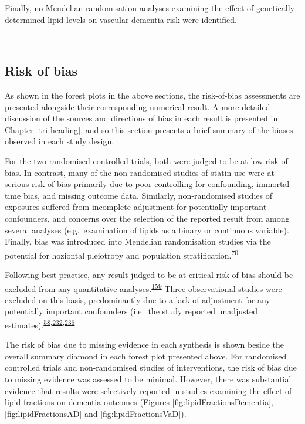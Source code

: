 \documentclass[a4paper, twoside]{templates/ociamthesis}
\begin{document}
Finally, no Mendelian randomisation analyses examining the effect of genetically determined lipid levels on vascular dementia risk were identified.

~

\hypertarget{risk-of-bias-res}{%
\subsection{Risk of bias}\label{risk-of-bias-res}}

As shown in the forest plots in the above sections, the risk-of-bias assessments are presented alongside their corresponding numerical result. A more detailed discussion of the sources and directions of bias in each result is presented in Chapter \ref{tri-heading}, and so this section presents a brief summary of the biases observed in each study design.

For the two randomised controlled trials, both were judged to be at low risk of bias. In contrast, many of the non-randomised studies of statin use were at serious risk of bias primarily due to poor controlling for confounding, immortal time bias, and missing outcome data. Similarly, non-randomised studies of exposures suffered from incomplete adjustment for potentially important confounders, and concerns over the selection of the reported result from among several analyses (e.g.~examination of lipids as a binary or continuous variable). Finally, bias was introduced into Mendelian randomisation studies via the potential for hoziontal pleiotropy and population stratification.\textsuperscript{\protect\hyperlink{ref-davies2018}{70}}

Following best practice, any result judged to be at critical risk of bias should be excluded from any quantitative analyses.\textsuperscript{\protect\hyperlink{ref-sterne2016}{159}} Three observational studies were excluded on this basis, predominantly due to a lack of adjustment for any potentially important confounders (i.e.~the study reported unadjusted estimates).\textsuperscript{\protect\hyperlink{ref-mainous2005}{58},\protect\hyperlink{ref-kuo2015}{232},\protect\hyperlink{ref-notkola1998}{236}}

The risk of bias due to missing evidence in each synthesis is shown beside the overall summary diamond in each forest plot presented above. For randomised controlled trials and non-randomised studies of interventions, the risk of bias due to missing evidence was assessed to be minimal. However, there was substantial evidence that results were selectively reported in studies examining the effect of lipid fractions on dementia outcomes (Figures \ref{fig:lipidFractionsDementia}, \ref{fig:lipidFractionsAD} and \ref{fig:lipidFractionsVaD}).
\end{document}
